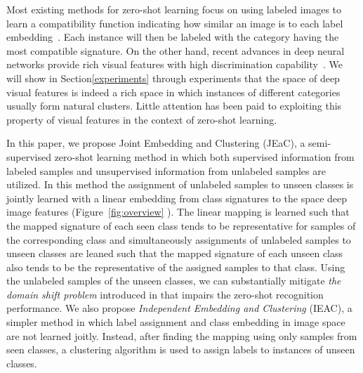 \documentclass[letterpaper]{article}
\begin{document}
Most existing methods for zero-shot learning focus on using labeled images to learn a compatibility function indicating how similar an image is
to each label embedding~\cite{Akata2015,emb15,sse}. Each instance will then be labeled with the category having the most compatible signature.
 On the other hand, recent advances in deep neural networks provide rich visual features with high discrimination capability~\cite{vgg}.
We will show in Section\ref{experiments} through experiments that the space of deep visual features is indeed a rich space
 in which instances of different categories usually form natural clusters.
Little attention has been paid to exploiting this property of visual features in the context of zero-shot learning.


In this paper, we propose Joint Embedding and Clustering (JEaC),
a semi-supervised zero-shot learning method in which both supervised information from labeled samples
and unsupervised information from unlabeled samples are utilized.
In this method the assignment of unlabeled samples to unseen classes is jointly learned
with a linear embedding from class signatures to the space deep image features (Figure~\ref{fig:overview} ).
The linear mapping is learned such that the mapped signature of each seen class tends to be representative
for samples of the corresponding class and simultaneously
assignments of unlabeled samples to unseen classes are leaned such that the mapped signature of each unseen class
 also tends to be the representative of the assigned samples to that class.
Using the unlabeled samples of the unseen classes, we can substantially mitigate
 \textit{the domain shift problem} introduced in \cite{eccv14} that impairs the zero-shot recognition performance.
We also propose \textit{Independent Embedding and Clustering} (IEAC),
a simpler method in which label assignment and class embedding in image space are not learned joitly.
Instead, after finding the mapping using only samples from seen classes,  a clustering algorithm is used to assign labels to instances of unseen classes.
\end{document}
